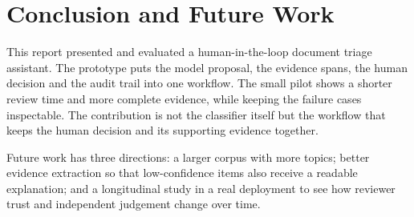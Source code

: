 \section{Conclusion and Future Work}
\label{sec:conclusion}

This report presented and evaluated a human-in-the-loop document triage assistant. The
prototype puts the model proposal, the evidence spans, the human decision and the audit trail
into one workflow. The small pilot shows a shorter review time and more complete evidence,
while keeping the failure cases inspectable. The contribution is not the classifier itself
but the workflow that keeps the human decision and its supporting evidence together.

Future work has three directions: a larger corpus with more topics; better evidence
extraction so that low-confidence items also receive a readable explanation; and a
longitudinal study in a real deployment to see how reviewer trust and independent judgement
change over time.
